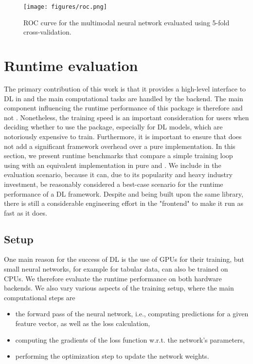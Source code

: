 \documentclass[article]{jss}
\theoremstyle{definition}
\begin{document}
\begin{figure}[H]
    \centering
    \texttt{[image: figures/roc.png]}
    \caption{ROC curve for the multimodal neural network evaluated using 5-fold cross-validation.}
    \label{fig:roc-curve}
\end{figure}

\section{Runtime evaluation}\label{sec:benchmarks}

The primary contribution of this work is that it provides a high-level interface to DL in \rlang{} and the main computational tasks are handled by the \torch{} backend.
The main component influencing the runtime performance of this package is therefore \torch{} and not \mlrttorch{}.
Nonetheless, the training speed is an important consideration for users when deciding whether to use the package, especially for DL models, which are notoriously expensive to train.
Furthermore, it is important to ensure that \mlrttorch{} does not add a significant framework overhead over a pure \torch{} implementation.
In this section, we present runtime benchmarks that compare a simple training loop using \mlrttorch{} with an equivalent implementation in pure \torch{} and \pytorch{}.
We include \pytorch{} in the evaluation scenario, because it can, due to its popularity and heavy industry investment, be reasonably considered a best-case scenario for the runtime performance of a DL framework.
Despite \torch{} and \pytorch{} being built upon the same \libtorch{} \cpp{} library, there is still a considerable engineering effort in the \pytorch{} "frontend" to make it run as fast as it does.

\subsection{Setup}
One main reason for the success of DL is the use of GPUs for their training, but small neural networks, for example for tabular data, can also be trained on CPUs.
We therefore evaluate the runtime performance on both hardware backends.
We also vary various aspects of the training setup, where the main computational steps are
\begin{itemize}
    \item the forward pass of the neural network, i.e., computing predictions for a given feature vector, as well as the loss calculation,
    \item computing the gradients of the loss function w.r.t. the network's parameters,
    \item performing the optimization step to update the network weights.
\end{itemize}
\end{document}
